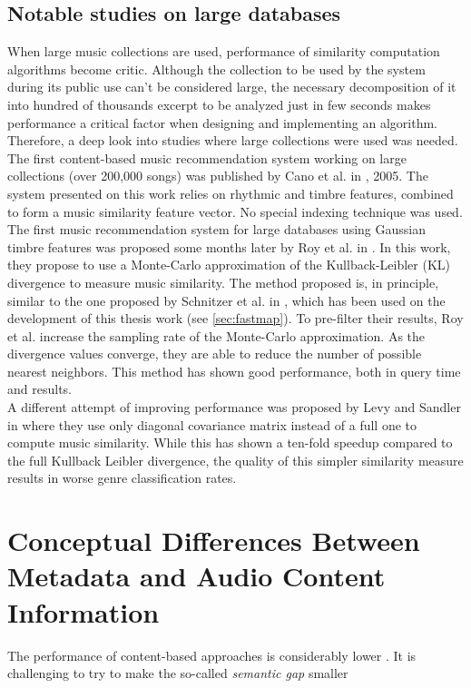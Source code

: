 \subsection{Notable studies on large databases}
When large music collections are used, performance of similarity computation algorithms become critic. Although the collection to be used by the system during its public use can't be considered large, the necessary decomposition of it into hundred of thousands excerpt to be analyzed just in few seconds makes performance a critical factor when designing and implementing an algorithm. Therefore, a deep look into studies where large collections were used was needed.\\
The first content-based music recommendation system working on large collections (over 200,000 songs) was published by Cano et al. in \cite{cano05}, 2005. The system presented on this work relies on rhythmic and timbre features, combined to form a music similarity feature vector. No special indexing technique was used. \\
The first music recommendation system for large databases using Gaussian timbre features was proposed some months later by Roy et al. in \cite{roy05}. In this work, they propose to use a Monte-Carlo approximation of the Kullback-Leibler (KL) divergence to measure music similarity. The method proposed is, in principle, similar to the one proposed by Schnitzer et al. in \cite{fastmap12}, which has been used on the development of this thesis work (see \ref{sec:fastmap}). To pre-filter their results, Roy et al. increase the sampling rate of the Monte-Carlo approximation. As the divergence values converge, they are able to reduce the number of possible nearest neighbors. This method has shown good performance, both in query time and results.\\
A different attempt of improving performance was proposed by Levy and Sandler in \cite{levy06} where they use only diagonal covariance matrix instead of a full one to compute music similarity. While this has shown a ten-fold speedup compared to the full Kullback Leibler divergence, the quality of this simpler similarity measure results in worse genre classification rates. 


\section{Conceptual Differences Between Metadata and Audio Content Information}
The performance of content-based approaches is considerably lower \cite{slaney2011}.
It is challenging to try to make the so-called \textit{semantic gap} smaller \cite{aucou2009}

